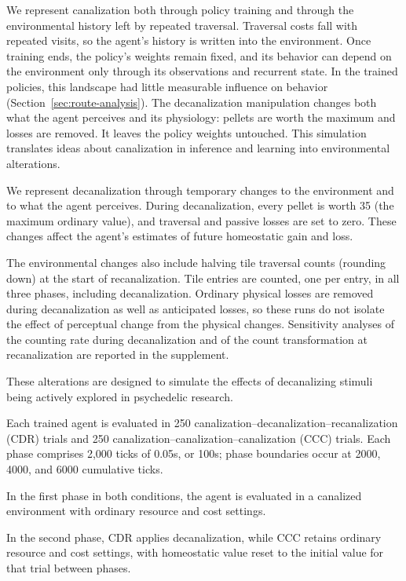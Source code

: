 \documentclass[12pt,fleqn]{article}
\begin{document}
We represent canalization both through policy training and through the environmental history left by repeated traversal. Traversal costs fall with repeated visits, so the agent's history is written into the environment. Once training ends, the policy's weights remain fixed, and its behavior can depend on the environment only through its observations and recurrent state. In the trained policies, this landscape had little measurable influence on behavior (Section~\ref{sec:route-analysis}). The decanalization manipulation changes both what the agent perceives and its physiology: pellets are worth the maximum and losses are removed. It leaves the policy weights untouched. This simulation translates ideas about canalization in inference and learning \cite{juliani_deep_2024} into environmental alterations.

We represent decanalization through temporary changes to the environment and to what the agent perceives. During decanalization, every pellet is worth 35 (the maximum ordinary value), and traversal and passive losses are set to zero. These changes affect the agent’s estimates of future homeostatic gain and loss. 

The environmental changes also include halving tile traversal counts (rounding down) at the start of recanalization. Tile entries are counted, one per entry, in all three phases, including decanalization. Ordinary physical losses are removed during decanalization as well as anticipated losses, so these runs do not isolate the effect of perceptual change from the physical changes. Sensitivity analyses of the counting rate during decanalization and of the count transformation at recanalization are reported in the supplement.

These alterations are designed to simulate the effects of decanalizing stimuli being actively explored in psychedelic research. %

Each trained agent is evaluated in 250 canalization--decanalization--recanalization (CDR) trials and 250 canalization--canalization--canalization (CCC) trials. Each phase comprises 2,000 ticks of 0.05s, or 100s; phase boundaries occur at 2000, 4000, and 6000 cumulative ticks.

In the first phase in both conditions, the agent is evaluated in a canalized environment with ordinary resource and cost settings. 

In the second phase, CDR applies decanalization, while CCC retains ordinary resource and cost settings, with homeostatic value reset to the initial value for that trial between phases.
\end{document}
